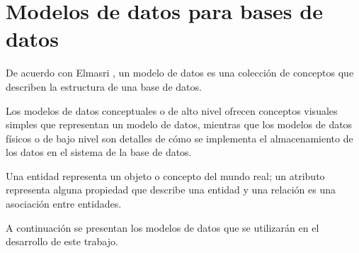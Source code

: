 \section{Modelos de datos para bases de datos}
De acuerdo con Elmasri \cite{ramez_elmasri_fundamentos_nodate}, un modelo de datos es una colección de conceptos que describen la estructura de una base de datos. 


Los modelos de datos conceptuales o de alto nivel ofrecen conceptos visuales simples que representan un modelo de datos, mientras que los modelos de datos físicos o de bajo nivel son detalles de cómo se implementa el almacenamiento de los datos en el sistema de la base de datos.


Una entidad representa un objeto o concepto del mundo real; un atributo representa alguna propiedad que describe una entidad y una relación es una asociación entre entidades.


A continuación se presentan los modelos de datos que se utilizarán en el desarrollo de este trabajo.